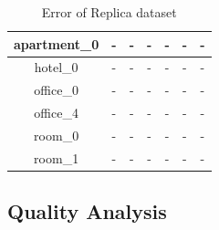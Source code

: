 \begin{table}[h!]
\begin{tabular}{ c | c | c | c | c | c | c }
		\hline
		apartment\_0 & - & - & -  & - & - & -  \\ 
		\hline
		hotel\_0 & - & - & -  & - & - & -  \\ 
		\hline
		office\_0 & - & - & - & - & - & -  \\ 
		\hline
		office\_4 & - & - & -  & - & - & -  \\ 
		\hline
		room\_0 & - & - & - & - & - & -  \\ 
		\hline
		room\_1 & - & - & -  & - & - & -  \\ 
		\hline
	\end{tabular}
	\caption{Error of Replica dataset}
	\label{fig:exp:quality}
\end{table}





\subsection{Quality Analysis}





